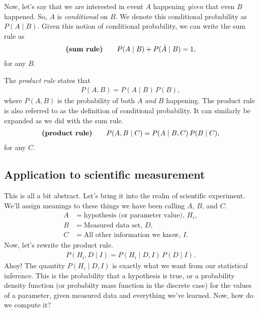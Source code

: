 Now, let's say that we are interested in event $A$ happening
\textit{given} that even $B$ happened.  So, $A$ is
\textit{conditional} on $B$.  We denote this conditional probability
as $P(A\mid B)$.  Given this notion of conditional probability, we can
write the sum rule as
\begin{align}
  \text{\textbf{(sum rule)}} \qquad P(A\mid B) + P(\bar{A} \mid B) = 1,
\end{align}
for any $B$.

The \textit{product rule} states that
\begin{align}
  P(A, B) = P(A\mid B)\, P(B),
\end{align}
where $P(A,B)$ is the probability of both $A$ \textit{and} $B$
happening.  The product rule is also referred to as the definition of
conditional probability.  It can similarly be expanded as we did with
the sum rule.
\begin{align}
   \text{\textbf{(product rule)}} \qquad P(A, B\mid C) = P(A\mid B, C)\, P(B \mid C),
\end{align}
for any $C$.

\subsection{Application to scientific measurement}
This is all a bit abstract.  Let's bring it into the realm of
scientific experiment.  We'll assign meanings to these things we have
been calling $A$, $B$, and $C$.
\begin{align}
A &= \text{hypothesis (or parameter value), } H_i, \\
B &= \text{Measured data set, } D,\\
C &= \text{All other information we know, } I.
\end{align}
Now, let's rewrite the product rule.
\begin{align}
P(H_i, D\mid I) = P(H_i \mid D, I)\, P(D \mid I).
\end{align}
Ahoy!  The quantity $P(H_i \mid D , I)$ is exactly what we want from
our statistical inference.  This is the probability that a hypothesis
is true, or a probability density function (or probabiity mass function in the discrete case) for the values of a parameter,
given measured data and everything we've learned.  Now, how do we
compute it?


